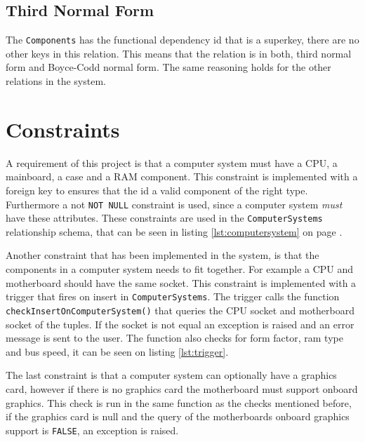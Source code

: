 \documentclass[12pt,a4paper]{article}
\begin{document}
\subsection{Third Normal Form}
The \texttt{Components} has the functional dependency id that is a superkey, there are no other keys in this relation. This means that the relation is in both, third normal form and Boyce-Codd normal form.
The same reasoning holds for the other relations in the system. 

\section{Constraints}
A requirement of this project is that a computer system must have a CPU, a mainboard, a case and a RAM component. 
This constraint is implemented with a foreign key to ensures that the id a valid component of the right type.
Furthermore a not \texttt{NOT NULL} constraint is used, since a computer system \emph{must} have these attributes. 
These constraints are used in the \texttt{ComputerSystems} relationship schema, that can be seen in listing \ref{lst:computersystem} on page \pageref{lst:computersystem}.

Another constraint that has been implemented in the system, is that the components in a computer system needs to fit together. For example a CPU and motherboard should have the same socket.
This constraint is implemented with a trigger that fires on insert in \texttt{ComputerSystems}. The trigger calls the function \texttt{checkInsertOnComputerSystem()} that queries the CPU socket and motherboard socket of the tuples. 
If the socket is not equal an exception is raised and an error message is sent to the user.
The function also checks for form factor, ram type and bus speed, it can be seen on listing \ref{lst:trigger}.

The last constraint is that a computer system can optionally have a graphics card, however if there is no graphics card the motherboard must support onboard graphics. 
This check is run in the same function as the checks mentioned before, if the  graphics card is null and the query of the motherboards onboard graphics support is \texttt{FALSE}, an exception is raised. 
\end{document}
